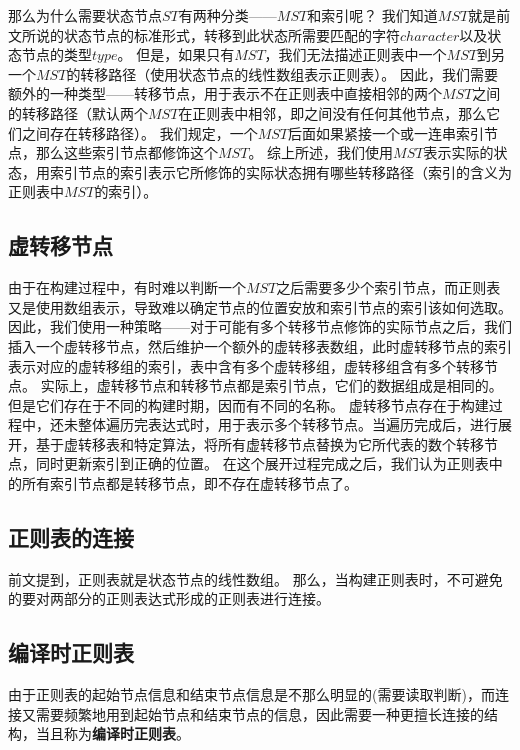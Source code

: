 \documentclass[12pt,a4paper,UTF8]{ctexart}
\begin{document}
\qquad 那么为什么需要状态节点$ST$有两种分类——$MST$和索引呢？
我们知道$MST$就是前文所说的状态节点的标准形式，转移到此状态所需要匹配的字符$character$以及状态节点的类型$type$。
但是，如果只有$MST$，我们无法描述正则表中一个$MST$到另一个$MST$的转移路径（使用状态节点的线性数组表示正则表）。
因此，我们需要额外的一种类型——转移节点，用于表示不在正则表中直接相邻的两个$MST$之间的转移路径（默认两个$MST$在正则表中相邻，即之间没有任何其他节点，那么它们之间存在转移路径）。
我们规定，一个$MST$后面如果紧接一个或一连串索引节点，那么这些索引节点都修饰这个$MST$。
综上所述，我们使用$MST$表示实际的状态，用索引节点的索引表示它所修饰的实际状态拥有哪些转移路径（索引的含义为正则表中$MST$的索引）。

\subsection{虚转移节点}

\qquad 由于在构建过程中，有时难以判断一个$MST$之后需要多少个索引节点，而正则表又是使用数组表示，导致难以确定节点的位置安放和索引节点的索引该如何选取。
因此，我们使用一种策略——对于可能有多个转移节点修饰的实际节点之后，我们插入一个虚转移节点，然后维护一个额外的虚转移表数组，此时虚转移节点的索引表示对应的虚转移组的索引，表中含有多个虚转移组，虚转移组含有多个转移节点。
实际上，虚转移节点和转移节点都是索引节点，它们的数据组成是相同的。但是它们存在于不同的构建时期，因而有不同的名称。
虚转移节点存在于构建过程中，还未整体遍历完表达式时，用于表示多个转移节点。当遍历完成后，进行展开，基于虚转移表和特定算法，将所有虚转移节点替换为它所代表的数个转移节点，同时更新索引到正确的位置。
在这个展开过程完成之后，我们认为正则表中的所有索引节点都是转移节点，即不存在虚转移节点了。

\subsection{正则表的连接}

\qquad 前文提到，正则表就是状态节点的线性数组。
那么，当构建正则表时，不可避免的要对两部分的正则表达式形成的正则表进行连接。

\subsection{编译时正则表}

\qquad 由于正则表的起始节点信息和结束节点信息是不那么明显的(需要读取判断)，而连接又需要频繁地用到起始节点和结束节点的信息，因此需要一种更擅长连接的结构，当且称为\textbf{编译时正则表}。
\end{document}
